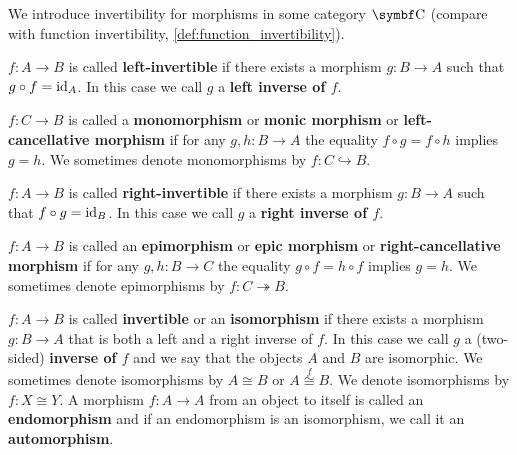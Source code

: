 \begin{definition}\label{def:morphism_invertibility}
  We introduce invertibility for morphisms in some category \( \Bold C \) (compare with function invertibility, \cref{def:function_invertibility}).

  \begin{defenum}
     \( f: A \to B \) is called \textbf{left-invertible} if there exists a morphism \( g: B \to A \) such that \( g \circ f = \operatorname{id}_A \). In this case we call \( g \) a \textbf{left inverse of \( f \)}.

     \( f: C \to B \) is called a \textbf{monomorphism} or \textbf{monic morphism} or \textbf{left-cancellative morphism} if for any \( g, h: B \to A \) the equality \( f \circ g = f \circ h \) implies \( g = h \). We sometimes denote monomorphisms by \( f: C \hookrightarrow B \).

     \( f: A \to B \) is called \textbf{right-invertible} if there exists a morphism \( g: B \to A \) such that \( f \circ g = \operatorname{id}_B \). In this case we call \( g \) a \textbf{right inverse of \( f \)}.

     \( f: A \to B \) is called an \textbf{epimorphism} or \textbf{epic morphism} or \textbf{right-cancellative morphism} if for any \( g, h: B \to C \) the equality \( g \circ f = h \circ f \) implies \( g = h \). We sometimes denote epimorphisms by \( f: C \twoheadrightarrow B \).

     \( f: A \to B \) is called \textbf{invertible} or an \textbf{isomorphism} if there exists a morphism \( g: B \to A \) that is both a left and a right inverse of \( f \). In this case we call \( g \) a (two-sided) \textbf{inverse of \( f \)} and we say that the objects \( A \) and \( B \) are isomorphic. We sometimes denote isomorphisms by \( A \cong B \) or \( A \overset f \cong B \). We denote isomorphisms by \( f: X \cong Y \). A morphism \( f: A \to A \) from an object to itself is called an \textbf{endomorphism} and if an endomorphism is an isomorphism, we call it an \textbf{automorphism}.
  \end{defenum}
\end{definition}

